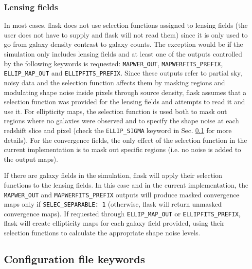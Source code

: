 \documentclass[12pt]{book} %
\begin{document}
\subsubsection{Lensing fields}

In most cases, {\sc flask} does not use selection functions assigned to lensing fields 
(the user does not have to supply and {\sc flask} will not read them) since it 
is only used to go from galaxy density contrast to galaxy counts. The exception would be 
if the simulation only includes lensing fields and at least one of the outputs controlled by the 
following keywords is requested: {\tt MAPWER\_OUT}, {\tt MAPWERFITS\_PREFIX}, 
{\tt ELLIP\_MAP\_OUT} and {\tt ELLIPFITS\_PREFIX}. Since these outputs refer to partial 
sky, noisy data and the selection function affects them by masking regions and modulating 
shape noise inside pixels through source density, {\sc flask} assumes that a selection 
function was provided for the lensing fields and attempts to read it and use it. 
For ellipticity maps, the selection function is used both to mask out regions where no 
galaxies were observed and to specify the shape noise at each redshift slice and pixel
(check the {\tt ELLIP\_SIGMA} keyword in Sec. \ref{sec:keywords} for more details).
For the convergence fields, the only effect of the selection function in the current 
implementation is to mask out specific regions (i.e. no noise is added to the output maps). 

If there are galaxy fields in the simulation, {\sc flask} will apply their selection 
functions to the lensing fields. In this case and in the current implementation, 
the {\tt MAPWER\_OUT} and {\tt MAPWERFITS\_PREFIX} 
outputs will produce masked convergence maps only if {\tt SELEC\_SEPARABLE: 1} 
(otherwise, {\sc flask} will return unmasked convergence maps). If requested through 
{\tt ELLIP\_MAP\_OUT} or {\tt ELLIPFITS\_PREFIX}, {\sc flask} will create ellipticity 
maps for each galaxy field provided, using their selection functions to calculate the 
appropriate shape noise levels. 
 
  
\subsection{Configuration file keywords}
\label{sec:keywords}
\end{document}

